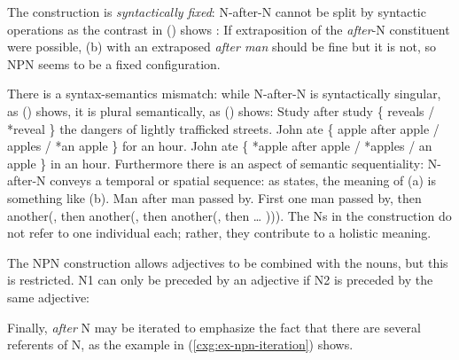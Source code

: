 \documentclass[output=paper,biblatex,babelshorthands,newtxmath,draftmode,colorlinks,citecolor=brown]{langscibook}
\begin{document}
\eal
\settowidth{}
\zl

The construction is \emph{syntactically fixed}: N-after-N cannot be split by syntactic operations as the
contrast in () shows \citep{Matsuyama2004a}:
\eal
{}
\zl
If extraposition of the \emph{after}-N constituent were possible, (b) with an extraposed
\emph{after man} should be fine but it is not, so NPN seems to be a fixed configuration.

There is a syntax-semantics mismatch:
while N-after-N is syntactically singular, as () shows, it is plural semantically, as
() shows:
\ea
Study after study \{ reveals / *reveal \} the dangers of lightly trafficked streets.
\z\vspace{-\baselineskip}
\eal
\ex John ate \{ apple after apple / apples / *an apple \} for an hour.
\ex John ate \{ *apple after apple / *apples / an apple \} in an hour.
\zl
Furthermore there is an aspect of semantic sequentiality: N-after-N conveys a temporal or spatial
sequence: as \citet{Bargmann2015a} states, the meaning of (a) is something like (b).
\eal
\ex Man after man passed by.
\ex First one man passed by, then another(, then another(, then another(, then  \ldots{} ))).
\zl
The Ns in the construction do not refer to one individual each; rather, they contribute to a holistic meaning.

\largerpage[2]
The NPN construction allows adjectives to be combined with the nouns, but this is restricted.
N1 can only be preceded by an adjective if N2 is preceded by the same adjective:
\eal
{}
\zl

Finally, \emph{after} N may be iterated to emphasize the fact that there are several referents of N, as the example in (\ref{cxg:ex-npn-iteration}) shows.
\end{document}

